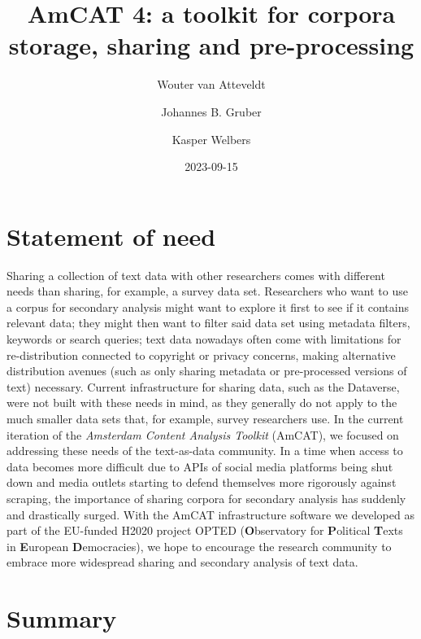 \documentclass[
  a4paper,
  DIV=11,
  numbers=noendperiod]{scrartcl}
\title{AmCAT 4: a toolkit for corpora storage, sharing and
pre-processing}
\author{Wouter van Atteveldt \and Johannes B. Gruber \and Kasper
Welbers}
\date{2023-09-15}
\begin{document}
\maketitle
\ifdefined\Shaded\renewenvironment{Shaded}{\begin{tcolorbox}[interior hidden, borderline west={3pt}{0pt}{shadecolor}, boxrule=0pt, enhanced, sharp corners, frame hidden, breakable]}{\end{tcolorbox}}\fi

\hypertarget{statement-of-need}{%
\section{Statement of need}\label{statement-of-need}}

Sharing a collection of text data with other researchers comes with
different needs than sharing, for example, a survey data set.
Researchers who want to use a corpus for secondary analysis might want
to explore it first to see if it contains relevant data; they might then
want to filter said data set using metadata filters, keywords or search
queries; text data nowadays often come with limitations for
re-distribution connected to copyright or privacy concerns, making
alternative distribution avenues (such as only sharing metadata or
pre-processed versions of text) necessary. Current infrastructure for
sharing data, such as the Dataverse, were not built with these needs in
mind, as they generally do not apply to the much smaller data sets that,
for example, survey researchers use. In the current iteration of the
\emph{Amsterdam Content Analysis Toolkit} (AmCAT), we focused on
addressing these needs of the text-as-data community. In a time when
access to data becomes more difficult due to APIs of social media
platforms being shut down and media outlets starting to defend
themselves more rigorously against scraping, the importance of sharing
corpora for secondary analysis has suddenly and drastically surged. With
the AmCAT infrastructure software we developed as part of the EU-funded
H2020 project OPTED (\textbf{O}bservatory for \textbf{P}olitical
\textbf{T}exts in \textbf{E}uropean \textbf{D}emocracies), we hope to
encourage the research community to embrace more widespread sharing and
secondary analysis of text data.

\hypertarget{summary}{%
\section{Summary}\label{summary}}
\end{document}

